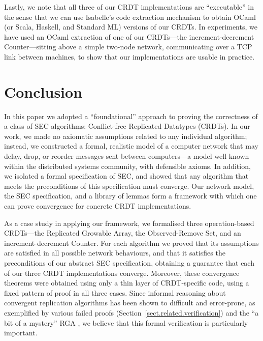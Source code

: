 \documentclass[acmlarge,review,anonymous]{acmart}
\begin{document}
Lastly, we note that all three of our CRDT implementations are ``executable'' in the sense that we can use Isabelle's code extraction mechanism to obtain OCaml (or Scala, Haskell, and Standard ML) versions of our CRDTs.
In experiments, we have used an OCaml extraction of one of our CRDTs---the increment-decrement Counter---sitting above a simple two-node network, communicating over a TCP link between machines, to show that our implementations are usable in practice.

\section{Conclusion}
\label{sect.conclusion}

In this paper we adopted a ``foundational'' approach to proving the correctness of a class of SEC algorithms: Conflict-free Replicated Datatypes (CRDTs).
In our work, we made no axiomatic assumptions related to any individual algorithm; instead, we constructed a formal, realistic model of a computer network that may delay, drop, or reorder messages sent between computers---a model well known within the distributed systems community, with defensible axioms.
In addition, we isolated a formal specification of SEC, and showed that any algorithm that meets the preconditions of this specification must converge.
Our network model, the SEC specification, and a library of lemmas form a framework with which one can prove convergence for concrete CRDT implementations.

As a case study in applying our framework, we formalised three operation-based CRDTs---the Replicated Growable Array, the Observed-Remove Set, and an increment-decrement Counter.
For each algorithm we proved that its assumptions are satisfied in all possible network behaviours, and that it satisfies the preconditions of our abstract SEC specification, obtaining a guarantee that each of our three CRDT implementations converge.
Moreover, these convergence theorems were obtained using only a thin layer of CRDT-specific code, using a fixed pattern of proof in all three cases.
Since informal reasoning about convergent replication algorithms has been shown to difficult and error-prone, as exemplified by various failed proofs (Section~\ref{sect.related.verification}) and the ``a bit of a mystery'' RGA \cite{Attiya:2016kh}, we believe that this formal verification is particularly important.
\end{document}
